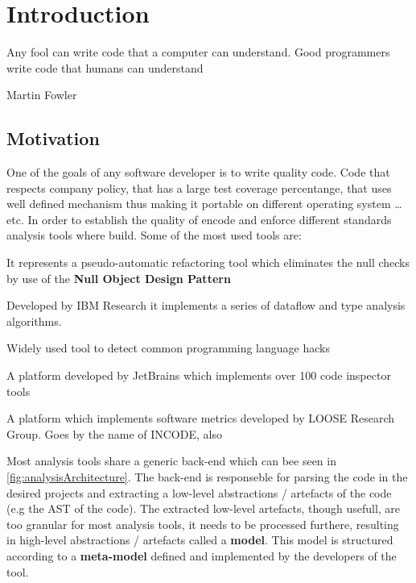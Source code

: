 \chapter{Introduction}\label{ch:1}

\epigraph{Any fool can write code that a computer can understand. Good
programmers write code that humans can understand}{Martin Fowler}

\section{Motivation}

        One of the goals of any software developer is to write quality code. Code that respects company policy, that has a
large test coverage percentange, that uses well defined mechanism thus making it portable on different operating system \ldots{} etc. 
In order to establish the quality of encode and enforce different standards analysis tools where build. Some of the most 
used tools are:
        \begin{description}[labelindent=2cm]
        \item[NullTerminator] It represents a pseudo-automatic refactoring tool which 
        eliminates the null checks by use of the \textbf{Null Object Design Pattern} \cite{tools:nullTerminator}
        \item[Wala Tool]  Developed by IBM Research it implements a series of dataflow
        and type analysis algorithms.
        \item[FindBugs]   Widely used tool to detect common programming language hacks
        \item[Intellij IDE] {A platform developed by JetBrains which implements over
        100 code inspector tools}
        \item[CodePro]   A platform which implements software metrics developed by
        LOOSE Research Group. Goes by the name of INCODE, also \cite{tools:inCode}
        \end{description}

        Most analysis tools share a generic back-end which can bee seen in \ref{fig:analysisArchitecture}. The back-end is responseble
for parsing the code in the desired projects and extracting a low-level abstractions / artefacts of the code (e.g the AST of the code). The extracted low-level artefacts,
though usefull, are too granular for most analysis tools, it needs to be processed furthere, resulting in high-level abstractions / artefacts called a \textbf{model}.  This
model is structured according to a \textbf{meta-model} defined and implemented by the developers of the tool. \cite{paper:xcore}

